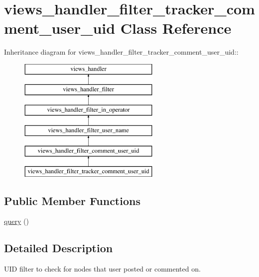\hypertarget{classviews__handler__filter__tracker__comment__user__uid}{
\section{views\_\-handler\_\-filter\_\-tracker\_\-comment\_\-user\_\-uid Class Reference}
\label{classviews__handler__filter__tracker__comment__user__uid}
}
Inheritance diagram for views\_\-handler\_\-filter\_\-tracker\_\-comment\_\-user\_\-uid::\begin{figure}[H]
\begin{center}
\leavevmode
\includegraphics[height=6cm]{classviews__handler__filter__tracker__comment__user__uid}
\end{center}
\end{figure}
\subsection*{Public Member Functions}
\begin{DoxyCompactItemize}
\item 
\hyperlink{classviews__handler__filter__tracker__comment__user__uid_a95b14e84882db3a1911c885c606e8835}{query} ()
\end{DoxyCompactItemize}


\subsection{Detailed Description}
UID filter to check for nodes that user posted or commented on. 


